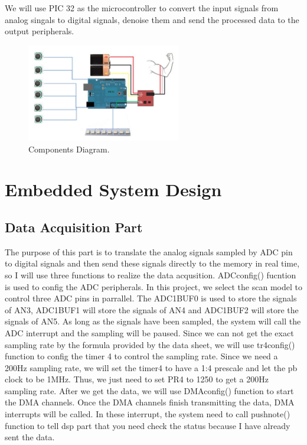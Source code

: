 \documentclass[12pt]{article}
\begin{document}
We will use PIC 32 as the microcontroller to convert the input signals from analog singals to digital signals, denoise them and send the processed data to the output peripherals.

\begin{figure}[H]
\centering
\includegraphics[width=0.6\textwidth]{hardware-diagram.png}
\caption{Components Diagram.}
\end{figure}

\newpage
\section{Embedded System Design}
\subsection{Data Acquisition Part}

The purpose of this part is to translate the analog signals sampled by ADC pin to digital signals and then send these signals directly to the memory in real time, so I will use three functions to realize the data acqusition. ADCconfig() fucntion is used to config the ADC peripherals. In this project, we select the scan model to control three ADC pins in parrallel. The ADC1BUF0 is used to store the signals of AN3, ADC1BUF1 will store the signals of AN4 and ADC1BUF2 will store the signals of AN5. As long as the signals have been sampled, the system will call the ADC interrupt and the sampling will be paused. Since we can not get the exact sampling rate by the formula provided by the data sheet, we will use tr4config() function to config the timer 4 to control the sampling rate. Since we need a 200Hz sampling rate, we will set the timer4 to have a 1:4 prescale and let the pb clock to be 1MHz. Thus, we just need to set PR4 to 1250 to get a 200Hz sampling rate. After we get the data, we will use DMAconfig() function to start the DMA channels. Once the DMA channels finish transmitting the data, DMA interrupts will be called. In these interrupt, the system need to call pushnote() function to tell dsp part that you need check the status because I have already sent the data.
\end{document}

